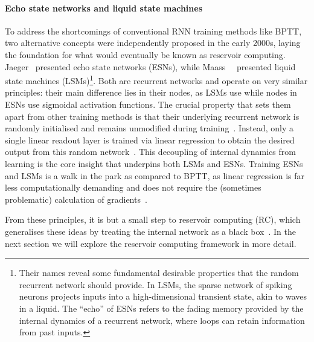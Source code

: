 \vspace{-1em}
\vspace{-1em}

\paragraph{Echo state networks and liquid state machines}
To address the shortcomings of conventional RNN training methods like BPTT, two alternative concepts were independently proposed in the early 2000s, laying the foundation for what would eventually be known as reservoir computing.
Jaeger~\cite{jaeger2001echo} presented echo state networks (ESNs), while Maass~\etal~\cite{maass_LSM} presented liquid state machines (LSMs)\footnote{
	Their names reveal some fundamental desirable properties that the random recurrent network should provide.
	In LSMs, the sparse network of spiking neurons projects inputs into a high-dimensional transient state, akin to waves in a liquid.
	The ``echo'' of ESNs refers to the fading memory provided by the internal dynamics of a recurrent network, where loops can retain information from past inputs.
}.
Both are recurrent networks and operate on very similar principles: their main difference lies in their nodes, as LSMs use  while nodes in ESNs use sigmoidal activation functions.
The crucial property that sets them apart from other training methods is that their underlying recurrent network is randomly initialised and remains unmodified during training~\cite{ReviewESNs,RC_Tensegrity}.
Instead, only a single linear readout layer is trained via linear regression to obtain the desired output from this random network~\cite{D-LSM,D-ESN-Improved}.
This decoupling of internal dynamics from learning is the core insight that underpins both LSMs and ESNs.
Training ESNs and LSMs is a walk in the park as compared to BPTT, as linear regression is far less computationally demanding and does not require the (sometimes problematic) calculation of gradients~\cite{D-ESN-Improved}. \par
From these principles, it is but a small step to reservoir computing (RC), which generalises these ideas by treating the internal network as a black box~\cite{RC_unification,D-ESN-Improved,RC_Tensegrity}.
In the next section we will explore the reservoir computing framework in more detail.

